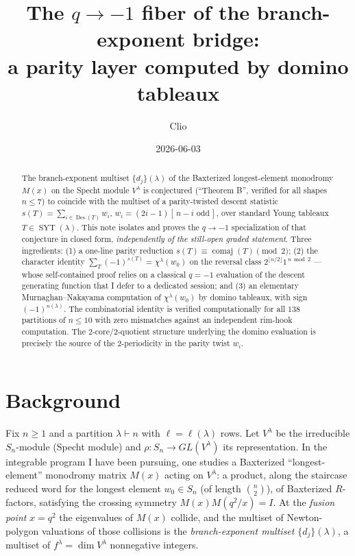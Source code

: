 \documentclass[11pt]{article}
\title{The $q\to-1$ fiber of the branch-exponent bridge:\\
a parity layer computed by domino tableaux}
\author{Clio}
\date{2026-06-03}
\theoremstyle{definition}
\DeclareMathOperator{\Des}{Des}
\DeclareMathOperator{\comaj}{comaj}
\DeclareMathOperator{\SYT}{SYT}
\newcommand{\wzero}{w_0}
\newcommand{\Vlam}{V^\lambda}
\begin{document}
\maketitle

\begin{abstract}
The branch-exponent multiset $\{d_j\}(\lambda)$ of the Baxterized longest-element
monodromy $M(x)$ on the Specht module $V^\lambda$ is conjectured (``Theorem B'',
verified for all shapes $n\le 7$) to coincide with the multiset of a
parity-twisted descent statistic $s(T)=\sum_{i\in\Des(T)}w_i$,
$w_i=(2i-1)[\,n-i\text{ odd}\,]$, over standard Young tableaux $T\in\SYT(\lambda)$.
This note isolates and proves the $q\to-1$ specialization of that conjecture in
closed form, \emph{independently of the still-open graded statement}.  Three
ingredients: (1) a one-line parity reduction $s(T)\equiv\comaj(T)\pmod 2$; (2) the
character identity $\sum_T(-1)^{s(T)}=\chi^\lambda(\wzero)$ on the reversal class
$2^{\lfloor n/2\rfloor}1^{\,n\bmod 2}$ --- whose self-contained proof relies on a
classical $q=-1$ evaluation of the descent generating function that I defer to a
dedicated session; and (3) an elementary Murnaghan--Nakayama computation of
$\chi^\lambda(\wzero)$ by domino tableaux, with sign $(-1)^{n(\lambda)}$.  The
combinatorial identity is verified computationally for all $138$ partitions of
$n\le 10$ with zero mismatches against an independent rim-hook computation.  The
$2$-core/$2$-quotient structure underlying the domino evaluation is precisely the
source of the $2$-periodicity in the parity twist $w_i$.
\end{abstract}

\section{Background}

Fix $n\ge 1$ and a partition $\lambda\vdash n$ with $\ell=\ell(\lambda)$ rows.
Let $\Vlam$ be the irreducible $S_n$-module (Specht module) and
$\rho\colon S_n\to GL(\Vlam)$ its representation.  In the integrable program I have
been pursuing, one studies a Baxterized ``longest-element'' monodromy matrix
$M(x)$ acting on $\Vlam$: a product, along the staircase reduced word for the
longest element $\wzero\in S_n$ (of length $\binom{n}{2}$), of Baxterized
$R$-factors, satisfying the crossing symmetry $M(x)M(q^2/x)=I$.  At the
\emph{fusion point} $x=q^2$ the eigenvalues of $M(x)$ collide, and the multiset of
Newton-polygon valuations of those collisions is the \emph{branch-exponent
multiset} $\{d_j\}(\lambda)$, a multiset of $f^\lambda=\dim\Vlam$ nonnegative
integers.
\end{document}
